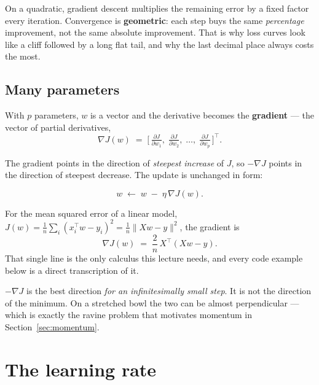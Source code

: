 \documentclass[11pt]{article}
\begin{document}
\begin{keyidea}
On a quadratic, gradient descent multiplies the remaining error by a fixed
factor every iteration. Convergence is \textbf{geometric}: each step buys the
same \emph{percentage} improvement, not the same absolute improvement. That is
why loss curves look like a cliff followed by a long flat tail, and why the
last decimal place always costs the most.
\end{keyidea}

\subsection{Many parameters}

With $p$ parameters, $w$ is a vector and the derivative becomes the
\textbf{gradient} --- the vector of partial derivatives,
\[
  \nabla J(w) \;=\;
  \Big[\, \tfrac{\partial J}{\partial w_1},\;
          \tfrac{\partial J}{\partial w_2},\; \dots,\;
          \tfrac{\partial J}{\partial w_p} \,\Big]^\top .
\]

The gradient points in the direction of \emph{steepest increase} of $J$, so
$-\nabla J$ points in the direction of steepest decrease. The update is
unchanged in form:

\begin{equation}
  \label{eq:gd}
  w \;\leftarrow\; w \;-\; \eta \, \nabla J(w).
\end{equation}

For the mean squared error of a linear model,
$J(w) = \frac{1}{n}\sum_i (x_i^\top w - y_i)^2 = \frac{1}{n}\lVert Xw-y\rVert^2$,
the gradient is
\begin{equation}
  \label{eq:lsgrad}
  \nabla J(w) \;=\; \frac{2}{n}\, X^\top (Xw - y).
\end{equation}
That single line is the only calculus this lecture needs, and every code
example below is a direct transcription of it.

\begin{caution}
$-\nabla J$ is the best direction \emph{for an infinitesimally small step}. It
is not the direction of the minimum. On a stretched bowl the two can be almost
perpendicular --- which is exactly the ravine problem that motivates momentum
in Section~\ref{sec:momentum}.
\end{caution}

\section{The learning rate}
\label{sec:lr}
\end{document}

